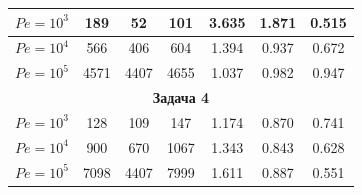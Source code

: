 \begin{center}
\begin{tabular}{|c|c|c|c|c|c|c|}
$Pe=10^3$ & 189 & 52 & 101 & 3.635 & 1.871 & 0.515 \\ 


\hline 


$Pe=10^4$ & 566 & 406 & 604 & 1.394 & 0.937 & 0.672 \\ 


\hline 


$Pe=10^5$ & 4571 & 4407 & 4655 & 1.037 & 0.982 & 0.947 \\ 


\hline 


\multicolumn{7}{|c|}{\bf Задача 4} \\ 


\hline 


$Pe=10^3$ & 128 & 109 & 147 & 1.174 & 0.870 & 0.741 \\ 


\hline 


$Pe=10^4$ & 900 & 670 & 1067 & 1.343 & 0.843 & 0.628 \\ 


\hline 


$Pe=10^5$ & 7098 & 4407 & 7999 & 1.611 & 0.887 & 0.551 \\ 


\hline 


\end{tabular} 


\end{center} 




\medskip


 


